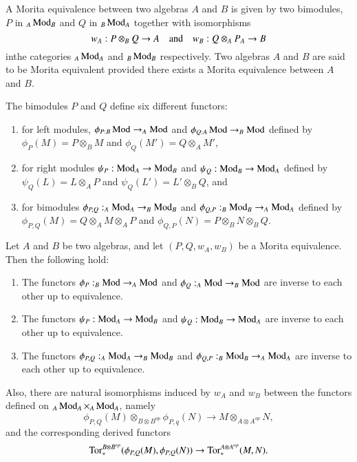 \begin{definition}\label{chap3-defi5.1}
A Morita equivalence between two algebras $A$ and $B$ is given by two
bimodules, $P$ in ${}_{A}\operatorname{Mod}_{B}$ and $Q$ in ${}_{B}\operatorname{Mod}_{A}$
together with isomorphisms
$$
w_{A}:P\otimes_{B}Q\to A\quad\text{and}\quad w_{B}:Q\otimes_{A}P_{A}\to B
$$
in\pageoriginale the categories ${}_{A}\operatorname{Mod}_{A}$ and ${}_{B}\operatorname{Mod}_{B}$
respectively. Two algebras $A$ and $B$ are said to be Morita
equivalent provided there exists a Morita equivalence between $A$ and
$B$.

The bimodules $P$ and $Q$ define six different functors:
\begin{enumerate}
\renewcommand{\theenumi}{\alph{enumi}}
\renewcommand{\labelenumi}{(\theenumi)}
\item for left modules, $\phi_{P:B}\operatorname{Mod}\to_{A}\operatorname{Mod}$ and
  $\phi_{Q:A}\operatorname{Mod}\to_{B}\operatorname{Mod}$ defined by $\phi_{P}(M)=P\otimes_{B}M$
  and $\phi_{Q}(M')=Q\otimes_{A}M'$, 

\item for right modules $\psi_{P}:\operatorname{Mod}_{A}\to \operatorname{Mod}_{B}$ and
  $\psi_{Q}:\operatorname{Mod}_{B}\to \operatorname{Mod}_{A}$ defined by
  $\psi_{Q}(L)=L\otimes_{A}P$ and $\psi_{Q}(L')=L'\otimes_{B}Q$, and 

\item for bimodules $\phi_{P,Q}:_A\operatorname{Mod}_{A}\to_{B}\operatorname{Mod}_{B}$ and
  $\phi_{Q,P}:_B \operatorname{Mod}_{B}\to_{A}\operatorname{Mod}_{A}$ defined by
  $\phi_{P,Q}(M)=Q\otimes_{A}M\otimes_{A}P$ and
  $\phi_{Q,P}(N)=P\otimes_{B}N\otimes_{B}Q$. 
\end{enumerate}
\end{definition}

\begin{proposition}\label{chap3-prop5.2}
Let $A$ and $B$ be two algebras, and let $(P,Q,w_{A},w_{B})$ be a
Morita equivalence. Then the following hold:
\begin{enumerate}
\renewcommand{\labelenumi}{\rm(\theenumi)}
\item The functors $\phi_{P}:_B\operatorname{Mod}\to_A\operatorname{Mod}$ and
  $\phi_{Q}:_A \operatorname{Mod}\to_{B}\operatorname{Mod}$ are inverse to each other up to
  equivalence.

\item The functors $\psi_{P}:\operatorname{Mod}_{A}\to \operatorname{Mod}_{B}$ and
  $\psi_{Q}:\operatorname{Mod}_{B}\to \operatorname{Mod}_{A}$ are inverse to each other up to
  equivalence.

\item The functors $\phi_{P,Q}:_A \operatorname{Mod}_{A}\to_{B}\operatorname{Mod}_{B}$ and
  $\phi_{Q,P}:_B \operatorname{Mod}_{B}\to_{A}\operatorname{Mod}_{A}$ are inverse to each other up
  to equivalence.
\end{enumerate}

Also, there are natural isomorphisms induced by $w_{A}$ and $w_{B}$
between the functors defined on ${}_{A}\operatorname{Mod}_{A}\times_{A}\operatorname{Mod}_{A}$,
namely
$$
\phi_{P,Q}(M)\otimes_{B\otimes B^{op}}\phi_{P,q}(N)\to
M\otimes_{A\otimes A^{op}}N,
$$
and the corresponding derived functors
$$
\operatorname{Tor}^{B\otimes B^{op}}_{\ast}(\phi_{P,Q}(M),\phi_{P,Q}(N))\to
\operatorname{Tor}^{A\otimes A^{op}}_{\ast}(M,N). 
$$
\end{proposition}

